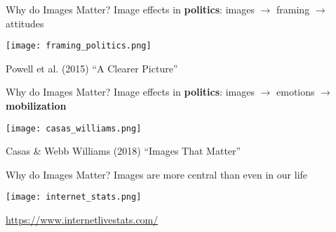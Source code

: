   \begin{frame}{Why do Images Matter?}
  \large{Image effects in \textbf{politics}: images $\rightarrow$ framing $\rightarrow$ attitudes}
  
  \texttt{[image: framing\_politics.png]} \centering
  
  \vfill
  \footnotesize Powell et al. (2015) ``A Clearer Picture''
  
  \end{frame}
  
  
  \begin{frame}{Why do Images Matter?}
  \large{Image effects in \textbf{politics}: images $\rightarrow$ emotions $\rightarrow$ \textbf{mobilization}}
  
  \texttt{[image: casas\_williams.png]} \centering
  
  \vfill
  \footnotesize Casas \& Webb Williams (2018) ``Images That Matter''
  
  \end{frame}
  
  \begin{frame}{Why do Images Matter?}
  \large{Images are more central than even in our life}
  
  \texttt{[image: internet\_stats.png]} \centering
  
  \vfill
  \footnotesize \url{https://www.internetlivestats.com/}
  
  
  \end{frame}
  
